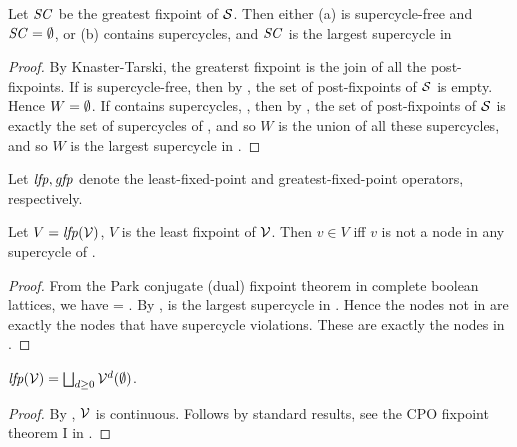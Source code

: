 \begin{proposition} \label{prop:GFPisLargestSC}
Let $\mathit{SC}$ be the greatest fixpoint of $\mathcal{S}$. Then either
(a)  is supercycle-free and $\mathit{SC} = \emptyset$, or 
(b)  contains supercycles, and $\mathit{SC}$ is the largest supercycle in 
\end{proposition}
%
\begin{proof}
By Knaster-Tarski, the greaterst fixpoint is the join of all the post-fixpoints. 
If  is supercycle-free, then by , the set of post-fixpoints of $\mathcal{S}$ is empty. 
Hence $W = \emptyset$.
If  contains supercycles, , then by ,  the set of post-fixpoints of $\mathcal{S}$ is exactly the set of 
supercycles of , and so $W$ is the union of all these supercycles, and so $W$ is the largest supercycle in .
\end{proof}

Let $\mathit{lfp}, \mathit{gfp}$ denote the least-fixed-point and greatest-fixed-point operators, respectively.

\begin{proposition}  \label{prop:LFPisScViolations}
Let  $V= \mathit{lfp}(\mathcal{V})$, \ie $V$ is the least fixpoint of $\mathcal{V}$. Then $v \in V$ iff $v$ is not a node in any supercycle of .    
\end{proposition}
%
\begin{proof}
From the Park conjugate (dual) fixpoint theorem in complete boolean lattices, we have 
\lfp{\VFs} = \compl{\gfp{\SFs}}.
By  , \gfp{\SFs} is the largest supercycle in . Hence the nodes not in 
\gfp{\SFs} are exactly the nodes that have supercycle violations. These are exactly the nodes in \lfp{\VFs}.
\end{proof}


\begin{proposition}  \label{prop:computeLFP}
$\mathit{lfp}(\mathcal{V}) = \bigsqcup_{d \ge 0} \mathcal{V}^{d} (\emptyset)$.
\end{proposition}
%
\begin{proof}
By , $\mathcal{V}$ is continuous. Follows by standard results, \eg see the CPO fixpoint theorem I in 
\cite{DP02}.
\end{proof}



